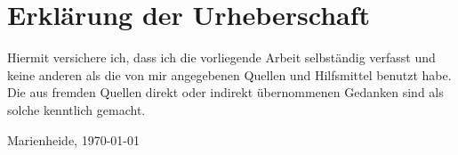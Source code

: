 \documentclass{../thesis}
\begin{document}
\chapter*{Erklärung der Urheberschaft}
\thispagestyle{empty}

Hiermit versichere ich, dass ich die vorliegende Arbeit selbständig
verfasst und keine anderen als die von mir angegebenen Quellen und
Hilfsmittel benutzt habe. Die aus fremden Quellen direkt oder indirekt
übernommenen Gedanken sind als solche kenntlich gemacht.


\vspace{4em}

\noindent Marienheide, \today
\end{document}
